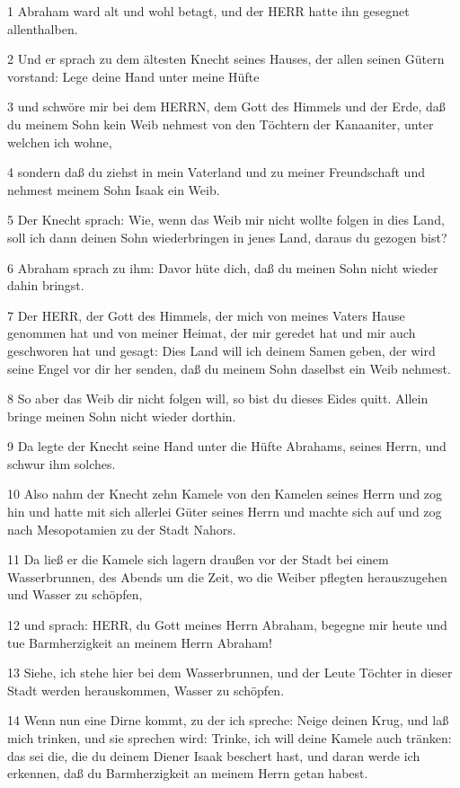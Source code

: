 \par 1 Abraham ward alt und wohl betagt, und der HERR hatte ihn gesegnet allenthalben.
\par 2 Und er sprach zu dem ältesten Knecht seines Hauses, der allen seinen Gütern vorstand: Lege deine Hand unter meine Hüfte
\par 3 und schwöre mir bei dem HERRN, dem Gott des Himmels und der Erde, daß du meinem Sohn kein Weib nehmest von den Töchtern der Kanaaniter, unter welchen ich wohne,
\par 4 sondern daß du ziehst in mein Vaterland und zu meiner Freundschaft und nehmest meinem Sohn Isaak ein Weib.
\par 5 Der Knecht sprach: Wie, wenn das Weib mir nicht wollte folgen in dies Land, soll ich dann deinen Sohn wiederbringen in jenes Land, daraus du gezogen bist?
\par 6 Abraham sprach zu ihm: Davor hüte dich, daß du meinen Sohn nicht wieder dahin bringst.
\par 7 Der HERR, der Gott des Himmels, der mich von meines Vaters Hause genommen hat und von meiner Heimat, der mir geredet hat und mir auch geschworen hat und gesagt: Dies Land will ich deinem Samen geben, der wird seine Engel vor dir her senden, daß du meinem Sohn daselbst ein Weib nehmest.
\par 8 So aber das Weib dir nicht folgen will, so bist du dieses Eides quitt. Allein bringe meinen Sohn nicht wieder dorthin.
\par 9 Da legte der Knecht seine Hand unter die Hüfte Abrahams, seines Herrn, und schwur ihm solches.
\par 10 Also nahm der Knecht zehn Kamele von den Kamelen seines Herrn und zog hin und hatte mit sich allerlei Güter seines Herrn und machte sich auf und zog nach Mesopotamien zu der Stadt Nahors.
\par 11 Da ließ er die Kamele sich lagern draußen vor der Stadt bei einem Wasserbrunnen, des Abends um die Zeit, wo die Weiber pflegten herauszugehen und Wasser zu schöpfen,
\par 12 und sprach: HERR, du Gott meines Herrn Abraham, begegne mir heute und tue Barmherzigkeit an meinem Herrn Abraham!
\par 13 Siehe, ich stehe hier bei dem Wasserbrunnen, und der Leute Töchter in dieser Stadt werden herauskommen, Wasser zu schöpfen.
\par 14 Wenn nun eine Dirne kommt, zu der ich spreche: Neige deinen Krug, und laß mich trinken, und sie sprechen wird: Trinke, ich will deine Kamele auch tränken: das sei die, die du deinem Diener Isaak beschert hast, und daran werde ich erkennen, daß du Barmherzigkeit an meinem Herrn getan habest.
